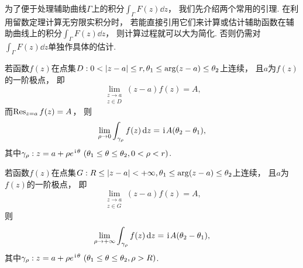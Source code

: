 为了便于处理辅助曲线\(\Gamma\)上的积分\(\int_\Gamma F(z) \dd{z}\)，
我们先介绍两个常用的引理.
在利用留数定理计算无穷限实积分时，
若能直接引用它们来计算或估计辅助函数在辅助曲线上的积分\(\int_\Gamma F(z) \dd{z}\)，
则计算过程就可以大为简化.
否则仍需对\(\int_\Gamma F(z) \dd{z}\)单独作具体的估计.

\begin{lemma}\label{theorem:留数定理.计算积分路径上没有奇点的无穷限积分.引理1}
若函数\(f(z)\)在点集\(D: 0<\abs{z-a}\leq r, \theta_1 \leq \arg(z-a) \leq \theta_2\)上连续，
且\(a\)为\(f(z)\)的一阶极点，
即\begin{equation}
	\lim_{\substack{z \to a \\ z \in D}} (z-a) f(z) = A,
\end{equation}
而\(\operatorname*{Res}_{z=a} f(z) = A\)，
则\begin{equation}
	\lim_{\rho\to0} \int_{\gamma_{\rho}} f(z) \dd{z}
	= \kern1pt\mathrm{i}\kern1pt A (\theta_2-\theta_1),
\end{equation}
其中\(\gamma_{\rho}: z=a+\rho e^{\kern1pt\mathrm{i}\kern1pt\theta}\ (\theta_1 \leq \theta \leq \theta_2, 0 < \rho < r)\).

若函数\(f(z)\)在点集\(G: R \leq \abs{z-a} < +\infty, \theta_1 \leq \arg(z-a) \leq \theta_2\)上连续，
且\(a\)为\(f(z)\)的一阶极点，
即\begin{equation}
	\lim_{\substack{z \to a \\ z \in G}} (z-a) f(z) = A,
\end{equation}
则\begin{equation}
	\lim_{\rho\to+\infty} \int_{\gamma_{\rho}} f(z) \dd{z}
	= \kern1pt\mathrm{i}\kern1pt A (\theta_2-\theta_1),
\end{equation}
其中\(\gamma_{\rho}: z=a+\rho e^{\kern1pt\mathrm{i}\kern1pt\theta}\ (\theta_1 \leq \theta \leq \theta_2, \rho > R)\).
\end{lemma}

